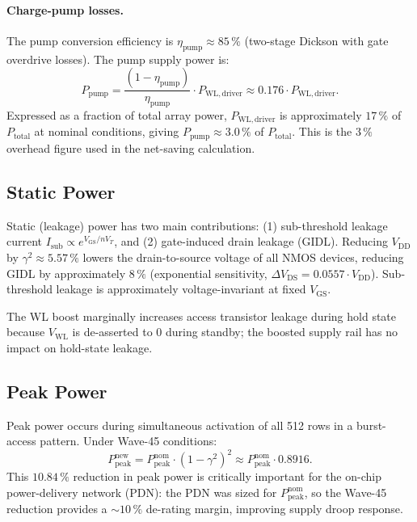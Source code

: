 \paragraph{Charge-pump losses.}
The pump conversion efficiency is $\eta_{\mathrm{pump}} \approx 85\,\%$
(two-stage Dickson with gate overdrive losses).  The pump supply power
is:
\[
  P_{\mathrm{pump}} = \frac{(1-\eta_{\mathrm{pump}})}{\eta_{\mathrm{pump}}}
  \cdot P_{\mathrm{WL,driver}}
  \approx 0.176 \cdot P_{\mathrm{WL,driver}}.
\]
Expressed as a fraction of total array power, $P_{\mathrm{WL,driver}}$
is approximately $17\,\%$ of $P_{\mathrm{total}}$ at nominal conditions,
giving $P_{\mathrm{pump}} \approx 3.0\,\%$ of $P_{\mathrm{total}}$.
This is the $3\,\%$ overhead figure used in the net-saving calculation.

\subsection{Static Power}

Static (leakage) power has two main contributions: (1) sub-threshold
leakage current $I_{\mathrm{sub}} \propto e^{V_{\mathrm{GS}}/nV_T}$,
and (2) gate-induced drain leakage (GIDL).  Reducing $V_{\mathrm{DD}}$
by $\gamma^{2} \approx 5.57\,\%$ lowers the drain-to-source voltage of
all NMOS devices, reducing GIDL by approximately $8\,\%$ (exponential
sensitivity, $\Delta V_{\mathrm{DS}} = 0.0557 \cdot V_{\mathrm{DD}}$).
Sub-threshold leakage is approximately voltage-invariant at fixed
$V_{\mathrm{GS}}$.

The WL boost marginally increases access transistor leakage during
hold state because $V_{\mathrm{WL}}$ is de-asserted to 0 during
standby; the boosted supply rail has no impact on hold-state leakage.

\subsection{Peak Power}

Peak power occurs during simultaneous activation of all 512 rows in a
burst-access pattern.  Under Wave-45 conditions:
\[
  P_{\mathrm{peak}}^{\mathrm{new}}
  = P_{\mathrm{peak}}^{\mathrm{nom}} \cdot (1-\gamma^{2})^{2}
  \approx P_{\mathrm{peak}}^{\mathrm{nom}} \cdot 0.8916.
\]
This $10.84\,\%$ reduction in peak power is critically important for
the on-chip power-delivery network (PDN): the PDN was sized for
$P_{\mathrm{peak}}^{\mathrm{nom}}$, so the Wave-45 reduction provides
a $\sim 10\,\%$ de-rating margin, improving supply droop response.

